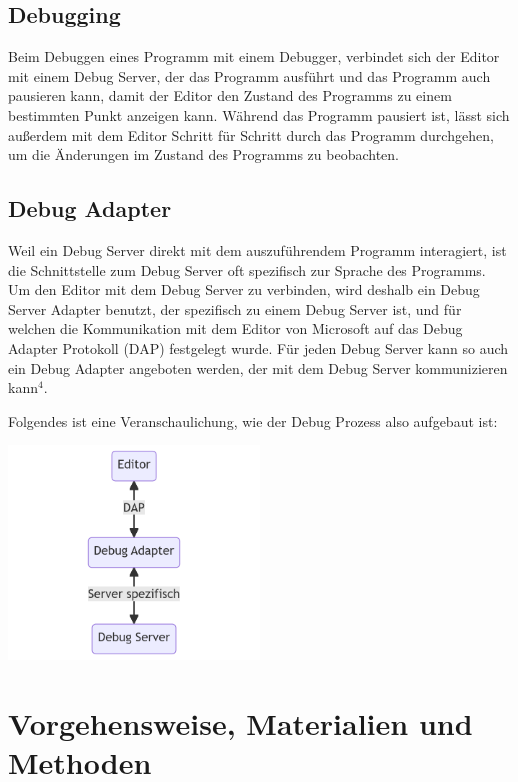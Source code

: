 \documentclass[a4paper,12pt,ngerman]{scrartcl}
\begin{document}
\subsection{Debugging}

Beim Debuggen eines Programm mit einem Debugger, verbindet sich der Editor mit einem Debug Server, der das Programm ausführt und das Programm auch pausieren kann, damit der Editor den Zustand des Programms zu einem bestimmten Punkt anzeigen kann. Während das Programm pausiert ist, lässt sich außerdem mit dem Editor Schritt für Schritt durch das Programm durchgehen, um die Änderungen im Zustand des Programms zu beobachten.

\subsection{Debug Adapter}

Weil ein Debug Server direkt mit dem auszuführendem Programm interagiert, ist die Schnittstelle zum Debug Server oft spezifisch zur Sprache des Programms. Um den Editor mit dem Debug Server zu verbinden, wird deshalb ein Debug Server Adapter benutzt, der spezifisch zu einem Debug Server ist, und für welchen die Kommunikation mit dem Editor von Microsoft auf das Debug Adapter Protokoll (DAP) festgelegt wurde. Für jeden Debug Server kann so auch ein Debug Adapter angeboten werden, der mit dem Debug Server kommunizieren kann$^4$.

Folgendes ist eine Veranschaulichung, wie der Debug Prozess also aufgebaut ist:

\begin{center}
	\includegraphics[width=0.5\textwidth]{debugger}
\end{center}

\section{Vorgehensweise, Materialien und Methoden}
\end{document}
